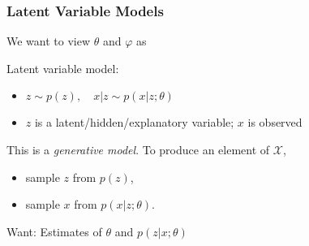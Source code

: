 \documentclass[xcolor={dvipsnames}]{beamer}
\renewcommand{\phi}{\varphi}
\newcommand{\df}[1]{\textcolor{BrickRed}{\emph{#1}}}
\newcommand{\cX}{\mathcal{X}}
\begin{document}
\begin{frame}
    \frametitle{Latent Variable Models}
    \setlength\parskip{1em}

    We want to view $\theta$ and $\phi$ as 

    Latent variable model:
    \begin{itemize}
        \setlength\itemsep{1em}
        \item $z\sim p(z),\quad x|z\sim p(x|z; \theta)$
        \item $z$ is a latent/hidden/explanatory variable; $x$ is observed
    \end{itemize}

    This is a \df{generative model}.
    To produce an element of $\cX$,
    \begin{itemize}
        \setlength\itemsep{1em}
        \item sample $z$ from $p(z)$,
        \item sample $x$ from $p(x|z;\theta)$.
    \end{itemize}
    Want: Estimates of $\theta$ and $p(z|x;\theta)$
\end{frame}
\end{document}

